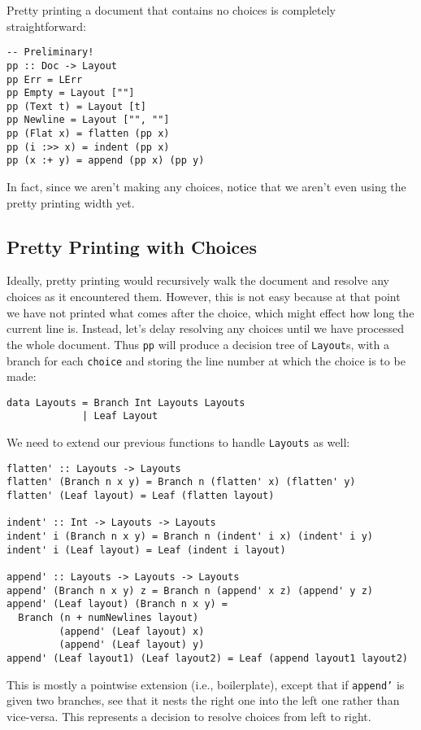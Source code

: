 \documentclass{article}
\newcommand{\code}[1]{\texttt{#1}}
\begin{document}
Pretty printing a document that contains no choices is completely straightforward:

\begin{lstlisting}
-- Preliminary!
pp :: Doc -> Layout
pp Err = LErr
pp Empty = Layout [""]
pp (Text t) = Layout [t]
pp Newline = Layout ["", ""]
pp (Flat x) = flatten (pp x)
pp (i :>> x) = indent (pp x)
pp (x :+ y) = append (pp x) (pp y)
\end{lstlisting}

In fact, since we aren't making any choices, notice that we aren't even using the pretty printing
width yet.

\subsection{Pretty Printing with Choices}

Ideally, pretty printing would recursively walk the document and resolve any choices as it
encountered them. However, this is not easy because at that point we have not printed what comes
after the choice, which might effect how long the current line is. Instead, let's delay resolving
any choices until we have processed the whole document. Thus \code{pp} will produce a decision tree
of \code{Layout}s, with a branch for each \code{choice} and storing the line number at which the
choice is to be made:

\begin{lstlisting}
data Layouts = Branch Int Layouts Layouts
             | Leaf Layout
\end{lstlisting}

We need to extend our previous functions to handle \code{Layouts} as well:
\begin{lstlisting}
flatten' :: Layouts -> Layouts
flatten' (Branch n x y) = Branch n (flatten' x) (flatten' y)
flatten' (Leaf layout) = Leaf (flatten layout)

indent' :: Int -> Layouts -> Layouts
indent' i (Branch n x y) = Branch n (indent' i x) (indent' i y)
indent' i (Leaf layout) = Leaf (indent i layout)

append' :: Layouts -> Layouts -> Layouts
append' (Branch n x y) z = Branch n (append' x z) (append' y z)
append' (Leaf layout) (Branch n x y) =
  Branch (n + numNewlines layout)
         (append' (Leaf layout) x)
         (append' (Leaf layout) y)
append' (Leaf layout1) (Leaf layout2) = Leaf (append layout1 layout2)
\end{lstlisting}
This is mostly a pointwise extension (i.e., boilerplate), except that if \code{append'} is given two
branches, see that it nests the right one into the left one rather than vice-versa. This represents
a decision to resolve choices from left to right.
\end{document}
